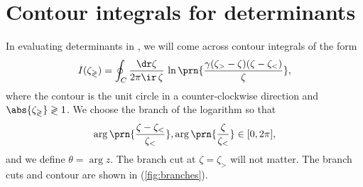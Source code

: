 \documentclass[12pt]{article}
\begin{document}
\section{Contour integrals for determinants}\label{sec:contourints}

In evaluating determinants in , we will come across contour integrals of the form
%
\begin{equation}\label{eq:contourint}
  I(\zeta_\gtrless) = \oint_C \frac{\dr\zeta}{2\pi\ir\,\zeta} \, \ln\prn{\frac{\gamma(\zeta_>-\zeta)(\zeta-\zeta_<)}{\zeta}},
\end{equation}
%
where the contour is the unit circle in a counter-clockwise direction and $\abs{\zeta_\gtrless}\gtrless1$.
We choose the branch of the logarithm so that
%
\begin{equation}\label{eq:branch}
  \arg\prn{\frac{\zeta-\zeta_<}{\zeta_<}},\arg\prn{\frac{\zeta}{\zeta_<}} \in [0,2\pi],
\end{equation}
%
and we define $\theta=\arg z$. 
The branch cut at $\zeta=\zeta_>$ will not matter.
The branch cuts and contour are shown in (\ref{fig:branches}).
\end{document}
